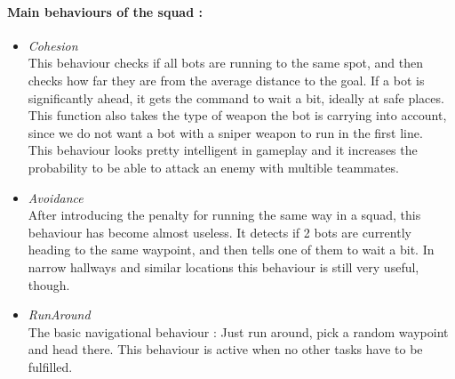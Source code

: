 \documentclass[12pt]{article}
\begin{document}
\paragraph {Main behaviours of the squad :}
\begin {itemize}
\item \textit{Cohesion}\\
This behaviour checks if all bots are running to the same spot, and then checks how far they are from the average distance to the goal. If a bot is significantly ahead, it gets the command to wait a bit, ideally at safe places. This function also takes the type of weapon the bot is carrying into account, since we do not want a bot with a sniper weapon to run in the first line.\\
This behaviour looks pretty intelligent in gameplay and it increases the probability to be able to attack an enemy with multible teammates.
\item \textit{Avoidance}\\
After introducing the penalty for running the same way in a squad, this behaviour has become almost useless. It detects if 2 bots are currently heading to the same waypoint, and then tells one of them to wait a bit. In narrow hallways and similar locations this behaviour is still very useful, though.
\item \textit{RunAround}\\
The basic navigational behaviour : Just run around, pick a random waypoint and head there. This behaviour is active when no other tasks have to be fulfilled.
\end {itemize}
\end{document}
